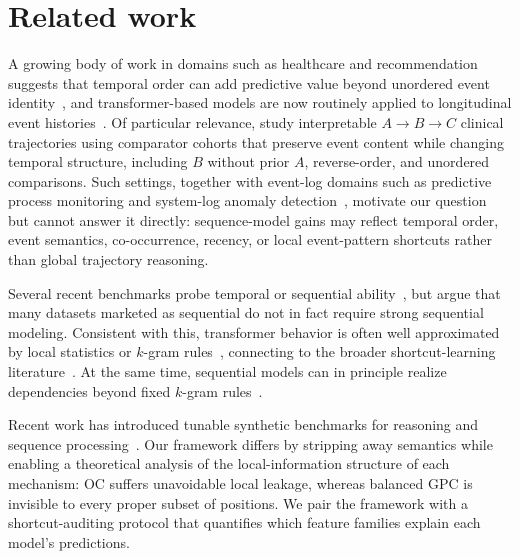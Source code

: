 \documentclass{article} %
\theoremstyle{plain}
\theoremstyle{definition}
\theoremstyle{remark}
\begin{document}
\section{Related work}
\label{sec:related_work}
A growing body of work in domains such as healthcare and recommendation suggests that temporal order can add predictive value beyond unordered event identity~\citep{beaney2024coded_disease_representations,placido2023pancreatic_trajectories,pollington2026trajectory_review,kimLostSequenceLarge2025b}, and transformer-based models are now routinely applied to longitudinal event histories~\citep{li2020behrt,rasmy2021medbert,savcisens2024using,delphi2025transformer}. Of particular relevance, \citet{edelman2026order_specific_ehr} study interpretable \(A\to B\to C\) clinical trajectories using comparator cohorts that preserve event content while changing temporal structure, including \(B\) without prior \(A\), reverse-order, and unordered comparisons. Such settings, together with event-log domains such as predictive process monitoring and system-log anomaly detection~\citep{teinemaa2019outcome,du2017deeplog}, motivate our question but cannot answer it directly: sequence-model gains may reflect temporal order, event semantics, co-occurrence, recency, or local event-pattern shortcuts rather than global trajectory reasoning.

Several recent benchmarks probe temporal or sequential ability~\citep{fatemiTESTTIMEBENCHMARK2025,cui2025timertemporalinstructionmodeling}, but \citet{klenitskiyDoesItLook2024} argue that many datasets marketed as sequential do not in fact require strong sequential modeling. Consistent with this, transformer behavior is often well approximated by local statistics or $k$-gram rules~\citep{nguyen2024understanding,kimLostSequenceLarge2025b,bediFidelityMedicalReasoning2025}, connecting to the broader shortcut-learning literature~\citep{mccoy2019right,geirhos2020shortcut,mirzadeh2024gsm}. At the same time, sequential models can in principle realize dependencies beyond fixed \(k\)-gram rules~\citep{olsson2022induction,guMambaLinearTimeSequence2024}.

Recent work has introduced tunable synthetic benchmarks for reasoning and sequence processing~\citep{kaiserCogniLoadSyntheticNatural2025,ramezanaliSeqBenchTunableBenchmark2025}. Our framework differs by stripping away semantics while enabling a theoretical analysis of the local-information structure of each mechanism: OC suffers unavoidable local leakage, whereas balanced GPC is invisible to every proper subset of positions. We pair the framework with a shortcut-auditing protocol that quantifies which feature families explain each model's predictions.
\end{document}
